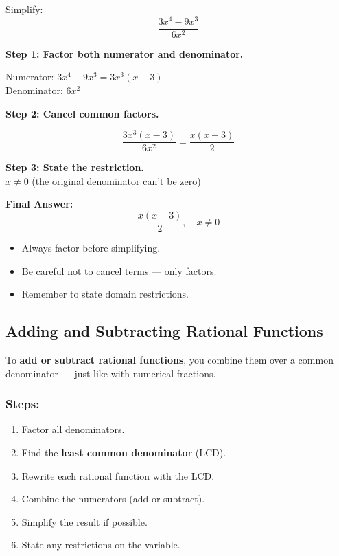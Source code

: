 \documentclass[11pt]{article}
\begin{document}
\begin{tcolorbox}
Simplify:
\[
\frac{3x^4 - 9x^3}{6x^2}
\]

\textbf{Step 1: Factor both numerator and denominator.}

Numerator: \( 3x^4 - 9x^3 = 3x^3(x - 3) \) \\
Denominator: \( 6x^2 \)

\textbf{Step 2: Cancel common factors.}

\[
\frac{3x^3(x - 3)}{6x^2} = \frac{x(x - 3)}{2}
\]

\textbf{Step 3: State the restriction.} \\
\( x \neq 0 \) (the original denominator can't be zero)

\textbf{Final Answer:}
\[
\frac{x(x - 3)}{2}, \quad x \neq 0
\]
\end{tcolorbox}

\begin{tcolorbox}[colback=blue!5!white, colframe=blue!80!black, title=Tips]
\begin{itemize}
  \item Always factor before simplifying.
  \item Be careful not to cancel terms — only factors.
  \item Remember to state domain restrictions.
\end{itemize}
\end{tcolorbox}

\subsection{Adding and Subtracting Rational Functions}

To \textbf{add or subtract rational functions}, you combine them over a common denominator — just like with numerical fractions.

\subsubsection*{Steps:}
\begin{enumerate}
  \item Factor all denominators.
  \item Find the \textbf{least common denominator} (LCD).
  \item Rewrite each rational function with the LCD.
  \item Combine the numerators (add or subtract).
  \item Simplify the result if possible.
  \item State any restrictions on the variable.
\end{enumerate}
\end{document}
